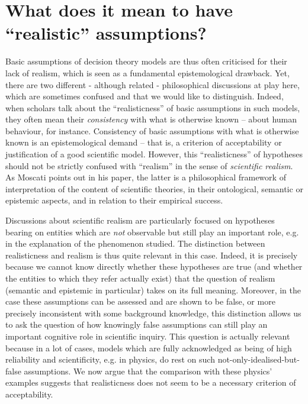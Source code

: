 \documentclass[a4paper,11pt]{article}
\theoremstyle{definition}
\begin{document}
\section{What does it mean to have ``realistic'' assumptions?}
\label{sec:realisticness}
Basic assumptions of decision theory models are thus often criticised for their lack of realism, which is seen as a fundamental epistemological drawback. Yet, there are two different - although related - philosophical discussions at play here, which are sometimes confused and that we would like to distinguish. Indeed, when scholars talk about the ``realisticness'' of basic assumptions in such models, they often mean their \textit{consistency} with what is otherwise known -- about human behaviour, for instance. Consistency of basic assumptions with what is otherwise known is an epistemological demand -- that is, a criterion of acceptability or justification of a good scientific model. However, this ``realisticness'' of hypotheses should not be strictly confused with ``realism'' in the sense of \textit{scientific realism}. As Moscati points out in his paper, the latter is a philosophical framework of interpretation of the content of scientific theories, in their ontological, semantic or epistemic aspects, and in relation to their empirical success. 

Discussions about scientific realism are particularly focused on hypotheses bearing on entities which are \textit{not} observable but still play an important role, e.g. in the explanation of the phenomenon studied. The distinction between realisticness and realism is thus quite relevant in this case. Indeed, it is precisely because we cannot know directly whether these hypotheses are true (and whether the entities to which they refer actually exist) that the question of realism (semantic and epistemic in particular) takes on its full meaning. Moreover, in the case these assumptions can be assessed and are shown to be false, or more precisely inconsistent with some background knowledge, this distinction allows us to ask the question of how knowingly false assumptions can still play an important cognitive role in scientific inquiry. This question is actually relevant because in a lot of cases, models which are fully acknowledged as being of high reliability and scientificity, e.g. in physics, do rest on such not-only-idealised-but-false assumptions. We now argue that the comparison with these physics’ examples suggests that realisticness does not seem to be a necessary criterion of acceptability.
\end{document}
